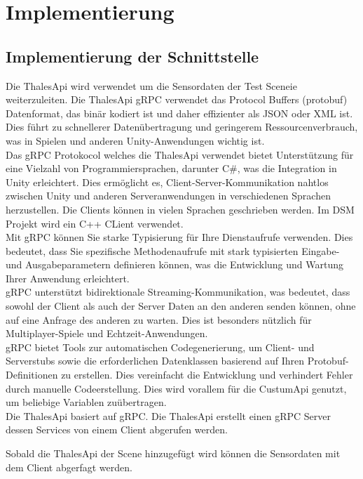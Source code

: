 \chapter{Implementierung}
\section{Implementierung der Schnittstelle}
Die ThalesApi wird verwendet um die Sensordaten der Test Sceneie weiterzuleiten.
Die ThalesApi gRPC verwendet das Protocol Buffers (protobuf) Datenformat, das binär kodiert ist und daher effizienter als JSON oder XML ist. Dies führt zu schnellerer Datenübertragung und geringerem Ressourcenverbrauch, was in Spielen und anderen Unity-Anwendungen wichtig ist.\\
Das gRPC Protokocol welches die ThalesApi verwendet bietet Unterstützung für eine Vielzahl von Programmiersprachen, darunter C\#, was die Integration in Unity erleichtert. Dies ermöglicht es, Client-Server-Kommunikation nahtlos zwischen Unity und anderen Serveranwendungen in verschiedenen Sprachen herzustellen. Die Clients können in vielen Sprachen geschrieben werden. Im DSM Projekt wird ein C++ CLient verwendet.\\
Mit gRPC können Sie starke Typisierung für Ihre Dienstaufrufe verwenden. Dies bedeutet, dass Sie spezifische Methodenaufrufe mit stark typisierten Eingabe- und Ausgabeparametern definieren können, was die Entwicklung und Wartung Ihrer Anwendung erleichtert.\\
gRPC unterstützt bidirektionale Streaming-Kommunikation, was bedeutet, dass sowohl der Client als auch der Server Daten an den anderen senden können, ohne auf eine Anfrage des anderen zu warten. Dies ist besonders nützlich für Multiplayer-Spiele und Echtzeit-Anwendungen.\\
gRPC bietet Tools zur automatischen Codegenerierung, um Client- und Serverstubs sowie die erforderlichen Datenklassen basierend auf Ihren Protobuf-Definitionen zu erstellen. Dies vereinfacht die Entwicklung und verhindert Fehler durch manuelle Codeerstellung. Dies wird vorallem für die CustumApi genutzt, um beliebige Variablen zuübertragen.\\
Die ThalesApi basiert auf gRPC. Die ThalesApi erstellt einen gRPC Server dessen Services von einem Client abgerufen werden.  

Sobald die ThalesApi der Scene hinzugefügt wird können die Sensordaten mit dem Client abgerfagt werden.

